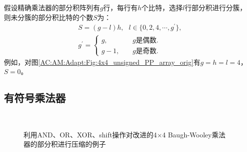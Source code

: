 假设精确乘法器的部分积阵列有$g$行，每行有$h$个比特，选择$l$行部分积进行分簇，则未分簇的部分积比特的个数$S$为：
\begin{align}
        & S = ( g - l ) h, \ \ \ l \in \{0, 2, 4, \cdots, g^{\prime} \} \label{AC:AM:Adapt:Eq:unsigned_S}, \\
        & g^{\prime} = \left\{
    \begin{aligned}
      g, \ \ \  & \ \ \ \ \ g \text{是偶数}. \\
      g - 1, & \ \ \ \ \ g \text{是奇数}.
    \end{aligned}
  \right.
  \label{AC:AM:Adapt:Eq:unsigned_g}
\end{align}
例如，对图\ref{AC:AM:Adapt:Fig:4x4_unsigned_PP_array_orig}有$g=h=l=4$，$S=0$。

\subsection{有符号乘法器}

\begin{figure}[ht]
    \centering
     \ \ \ 
    \caption{利用AND、OR、XOR、shift操作对改进的4$\times$4 Baugh-Wooley乘法器的部分积进行压缩的例子}
    \label{AC:AM:Adapt:Fig:4x4_signed}
\end{figure}

